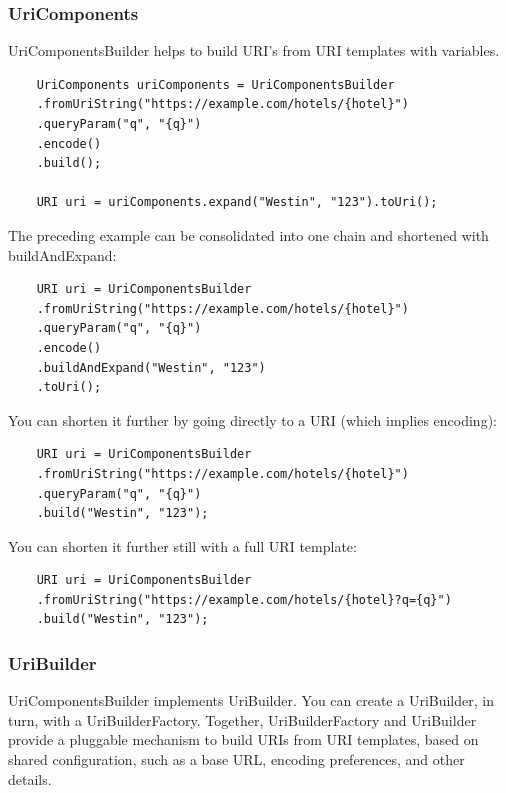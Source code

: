 \documentclass{scrartcl}
\begin{document}
\subsubsection{UriComponents}

UriComponentsBuilder helps to build URI’s from URI templates with variables.

\begin{lstlisting}
    UriComponents uriComponents = UriComponentsBuilder
    .fromUriString("https://example.com/hotels/{hotel}")
    .queryParam("q", "{q}")
    .encode()
    .build();

    URI uri = uriComponents.expand("Westin", "123").toUri();
\end{lstlisting}

The preceding example can be consolidated into one chain and shortened with buildAndExpand:

\begin{lstlisting}
    URI uri = UriComponentsBuilder
    .fromUriString("https://example.com/hotels/{hotel}")
    .queryParam("q", "{q}")
    .encode()
    .buildAndExpand("Westin", "123")
    .toUri();

\end{lstlisting}

You can shorten it further by going directly to a URI (which implies encoding):

\begin{lstlisting}
    URI uri = UriComponentsBuilder
    .fromUriString("https://example.com/hotels/{hotel}")
    .queryParam("q", "{q}")
    .build("Westin", "123");

\end{lstlisting}

You can shorten it further still with a full URI template:

\begin{lstlisting}
    URI uri = UriComponentsBuilder
    .fromUriString("https://example.com/hotels/{hotel}?q={q}")
    .build("Westin", "123");
\end{lstlisting}

\subsubsection{UriBuilder}

UriComponentsBuilder implements UriBuilder. You can create a UriBuilder, in turn, with a UriBuilderFactory. Together, UriBuilderFactory and UriBuilder provide a pluggable mechanism to build URIs from URI templates, based on shared configuration, such as a base URL, encoding preferences, and other details.
\end{document}
